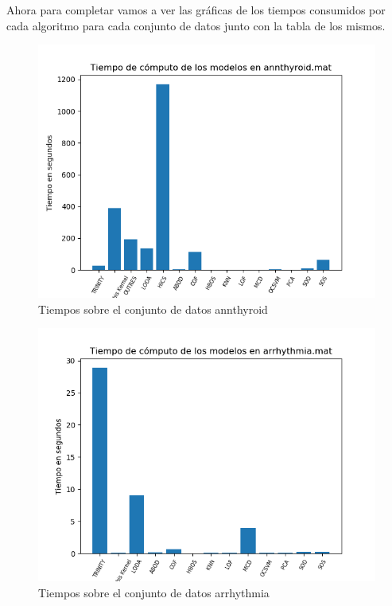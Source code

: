 Ahora para completar vamos a ver las gráficas de los tiempos consumidos por cada algoritmo para cada conjunto de datos junto con la tabla de los mismos.

\begin{figure}[H]
	\centering
	\includegraphics[scale=0.7]{imagenes/imgs-exp1/times/annthyroid}
	\caption{Tiempos sobre el conjunto de datos annthyroid}
	\label{annthyroid_times}
\end{figure}

\begin{figure}[H]
	\centering
	\includegraphics[scale=0.7]{imagenes/imgs-exp1/times/arrhythmia}
	\caption{Tiempos sobre el conjunto de datos arrhythmia}
	\label{arrhythmia_times}
\end{figure}

